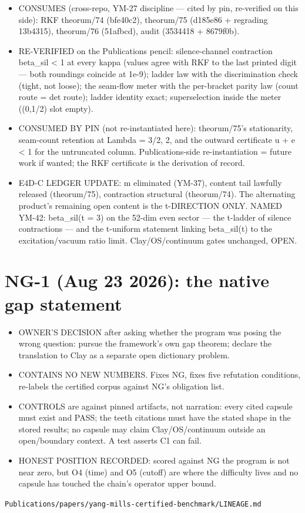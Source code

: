\begin{itemize}
\tightlist
\item
  CONSUMES (cross-repo, YM-27 discipline --- cited by pin, re-verified on
  this side): RKF theorum/74 (bfe40c2), theorum/75 (d185e86 + regrading
  13b4315), theorum/76 (51afbcd), audit (3534418 + 8679f0b).
\item
  RE-VERIFIED on the Publications pencil: silence-channel contraction
  beta\_sil \textless{} 1 at every kappa (values agree with RKF to the last printed
  digit --- both roundings coincide at 1e-9); ladder law with the
  discrimination check (tight, not loose); the seam-flow meter with the
  per-bracket parity law (count route = det route); ladder identity
  exact; superselection inside the meter ((0,1/2) slot empty).
\item
  CONSUMED BY PIN (not re-instantiated here): theorum/75's stationarity,
  seam-count retention at Lambda = 3/2, 2, and the outward certificate
  u + e \textless{} 1 for the untruncated column. Publications-side
  re-instantiation = future work if wanted; the RKF certificate is the
  derivation of record.
\item
  E4D-C LEDGER UPDATE: m eliminated (YM-37), content tail lawfully
  released (theorum/75), contraction structural (theorum/74). The
  alternating product's remaining open content is the t-DIRECTION ONLY.
  NAMED YM-42: beta\_sil(t = 3) on the 52-dim even sector --- the t-ladder
  of silence contractions --- and the t-uniform statement linking
  beta\_sil(t) to the excitation/vacuum ratio limit. Clay/OS/continuum
  gates unchanged, OPEN.
\end{itemize}

\hypertarget{ng-1-aug-23-2026-the-native-gap-statement}{%
\section{NG-1 (Aug 23 2026): the native gap statement}\label{ng-1-aug-23-2026-the-native-gap-statement}}

\begin{itemize}
\tightlist
\item
  OWNER'S DECISION after asking whether the program was posing the wrong
  question: pursue the framework's own gap theorem; declare the
  translation to Clay as a separate open dictionary problem.
\item
  CONTAINS NO NEW NUMBERS. Fixes NG, fixes five refutation conditions,
  re-labels the certified corpus against NG's obligation list.
\item
  CONTROLS are against pinned artifacts, not narration: every cited
  capsule must exist and PASS; the teeth citations must have the stated
  shape in the stored results; no capsule may claim Clay/OS/continuum
  outside an open/boundary context. A test asserts C1 can fail.
\item
  HONEST POSITION RECORDED: scored against NG the program is not near
  zero, but O4 (time) and O5 (cutoff) are where the difficulty lives and
  no capsule has touched the chain's operator upper bound.
\end{itemize}

\begin{flushright}\small\texttt{Publications/papers/yang-mills-certified-benchmark/LINEAGE.md}\end{flushright}
